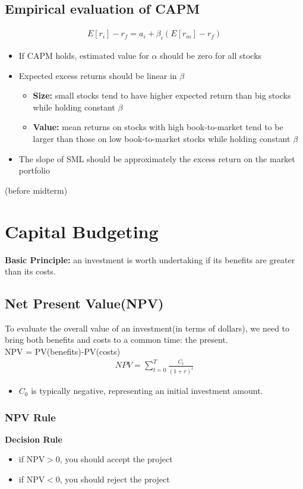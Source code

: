 \documentclass{article}
\theoremstyle{definition}
\theoremstyle{thrm}
\theoremstyle{lma}
\theoremstyle{ppst}
\theoremstyle{crlr}
\begin{document}
\subsection{Empirical evaluation of CAPM}
\begin{align*}
	E[r_i]-r_f = a_i+\beta_i(E[r_m]-r_f)
\end{align*}
\begin{itemize}
	\item If CAPM holds, estimated value for $\alpha$ should be zero for all stocks
	\item Expected excess returns should be linear in $\beta$
	\begin{itemize}
		\item \textbf{Size:} small stocks tend to have higher expected return than big stocks while holding constant $\beta$
		\item \textbf{Value: }mean returns on stocks with high book-to-market tend to be larger than those on low book-to-market stocks while holding constant $\beta$
	\end{itemize}
	\item The slope of SML should be approximately the excess return on the market portfolio
\end{itemize}

(before midterm)
\pagebreak
\section{Capital Budgeting}
\textbf{Basic Principle: } an investment is worth undertaking if its benefits are greater than its costs. 
\subsection{Net Present Value(NPV)}
To evaluate the overall value of an investment(in terms of dollars), we need to bring both benefits and costs to a common time: the present.\\
NPV = PV(benefits)-PV(costs)
\begin{align*}
	NPV = \sum_{t=0}^T \frac{C_t}{(1+r)^t}
\end{align*}
\begin{itemize}
	\item $C_0$ is typically negative, representing an initial investment amount. 
\end{itemize}
\subsubsection{NPV Rule}
\textbf{Decision Rule}
\begin{itemize}
	\item if NPV$>$0, you should accept the project
	\item if NPV$<$0, you should reject the project
\end{itemize}
\end{document}
